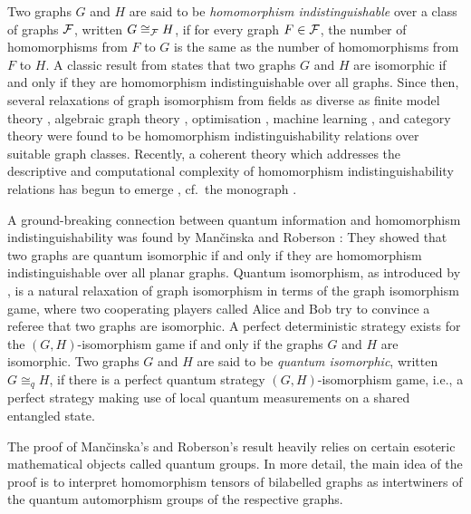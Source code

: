 \documentclass[11pt,a4paper]{article}
\theoremstyle{plain}
\theoremstyle{remark}
\theoremstyle{definition}
\begin{document}
Two graphs $G$ and $H$ are said to be \emph{homomorphism indistinguishable} over a class of graphs ${\mathcal F}$, written $G \cong_{{\mathcal F}} H$, if for every graph $F \in {\mathcal F}$, the number of homomorphisms from $F$ to $G$ is the same as the number of homomorphisms from $F$ to $H$. A classic result from \cite{lovasz_operations_1967} states that two graphs $G$ and $H$ are isomorphic if and only if they are homomorphism indistinguishable over all graphs. 
Since then, several relaxations of graph isomorphism from fields as diverse as finite model theory \cite{sherali-adams-3,grohe_counting_2020,fluck_going_2024}, algebraic graph theory \cite{dell_lovasz_2018}, optimisation \cite{grohe_homomorphism_2022,roberson-seppelt-arxiv}, machine learning \cite{xu_how_2019,morris_weisfeiler_2019,zhang_beyond_2024}, and category theory \cite{dawar_lovasz-type_2021,abramsky_discrete_2022,montacute_pebble-relation_2022} were found to be homomorphism indistinguishability relations over suitable graph classes. 
Recently, a coherent theory which addresses the descriptive and computational complexity of homomorphism indistinguishability relations has begun to emerge \cite{roberson_oddomorphisms_2022,seppelt_logical_2023,neuen_homomorphism-distinguishing_2023,seppelt_algorithmic_2024}, cf.\ the monograph \cite{seppelt_homomorphism_2024}.



A ground-breaking connection between quantum information and homomorphism indistinguishability was found by Man\v{c}inska and Roberson \cite{david-laura}: 
They showed that two graphs are quantum isomorphic if and only if they are homomorphism indistinguishable over all planar graphs.
Quantum isomorphism, as introduced by \cite{ATSERIAS2019289}, is a natural relaxation of graph isomorphism in terms of the graph isomorphism game, where two cooperating players called Alice and Bob try to convince a referee that two graphs are isomorphic. A perfect deterministic strategy exists for the $(G, H)$-isomorphism game if and only if the graphs $G$ and $H$ are isomorphic. 
Two graphs $G$ and $H$ are said to be \emph{quantum isomorphic}, written $G \cong_q H$, if there is a perfect quantum strategy $(G, H)$-isomorphism game, i.e., a perfect strategy making use of local quantum measurements on a shared entangled state. 




The proof of Man\v{c}inska's and Roberson's result \cite{david-laura} heavily relies on certain esoteric mathematical objects called quantum groups. 
In more detail, the main idea of the proof is to interpret homomorphism tensors of bilabelled graphs as intertwiners of the quantum automorphism groups of the respective graphs. 
\end{document}

